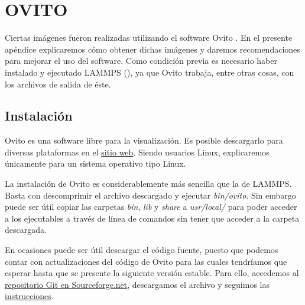 
\chapter{OVITO} %

\label{AB} %


Ciertas imágenes fueron realizadas utilizando el software Ovito \citep{stukowski10}. En el presente apéndice explicaremos cómo obtener dichas imágenes y daremos recomendaciones para mejorar el uso del software. Como condición previa es necesario haber instalado y ejecutado LAMMPS (), ya que Ovito trabaja, entre otras cosas, con los archivos de salida de éste.

\section{Instalación}
\label{AB_1}

Ovito es una software libre para la visualización. Es posible descargarlo para diversas plataformas en el \href{http://www.ovito.org/index.php/download}{sitio web}. Siendo usuarios Linux, explicaremos únicamente para un sistema operativo tipo Linux.

La instalación de Ovito es considerablemente más sencilla que la de LAMMPS. Basta con descomprimir el archivo descargado y ejecutar \textit{bin/ovito}. Sin embargo puede ser útil copiar las carpetas \textit{bin}, \textit{lib} y \textit{share} a \textit{usr/local/} para poder acceder a los ejecutables a través de línea de comandos sin tener que acceder a la carpeta descargada.

En ocasiones puede ser útil descargar el código fuente, puesto que podemos contar con actualizaciones del código de Ovito para las cuales tendríamos que esperar hasta que se presente la siguiente versión estable. Para ello, accedemos al \href{http://sourceforge.net/p/ovito/git/ci/master/tree/}{repositorio Git en Sourceforge.net}, descargamos el archivo y seguimos las \href{http://www.ovito.org/manual/development.build_linux.html}{instrucciones}.

